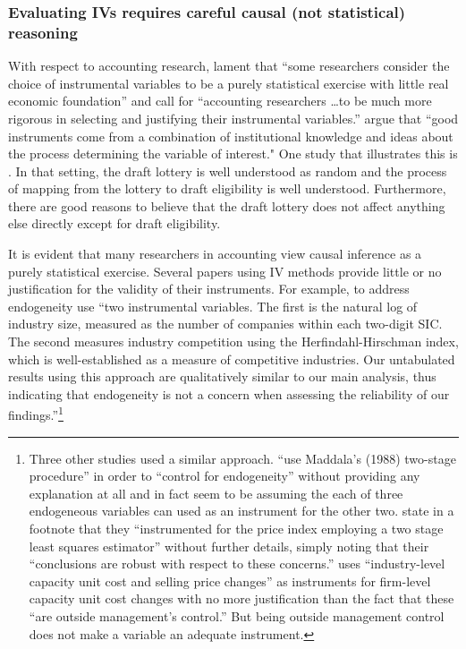 \documentclass[11pt,reqno,titlepage]{amsart}
\begin{document}
\begin{doublespace}
\subsubsection{Evaluating IVs requires careful causal (not statistical) reasoning}

With respect to accounting research, \citet{Larcker:2010fq} lament that ``some researchers consider the choice of instrumental variables to be a purely statistical exercise with little real economic foundation'' and call for 
``accounting researchers \dots to be much more rigorous in selecting and justifying their instrumental variables.'' 
\citet[p.117]{Angrist:2008vk} argue that ``good instruments come from a combination of institutional knowledge and ideas about the process determining the variable of interest."
One study that illustrates this is \citet{Angrist:1990dk}.
In that setting, the draft lottery is well understood as random and the process of mapping from the lottery to draft eligibility is well understood.
Furthermore, there are good reasons to believe that the draft lottery does not affect anything else directly except for draft eligibility.


It is evident that many researchers in accounting view causal inference as a purely statistical exercise.
Several papers using IV methods  provide little or no justification for the validity of their instruments.
For example, to address endogeneity \citet{Cohen:2014jl} use ``two instrumental variables. The first is the natural log of industry size, measured as the number of companies within each two-digit SIC. The second measures industry competition using the Herfindahl-Hirschman index, which is well-established as a measure of competitive industries. Our untabulated results using this approach are qualitatively similar to our main analysis, thus indicating that endogeneity is not a concern when assessing the reliability of our findings.''\footnote{
Three other studies used a similar approach.
 \citet{Vermeer:2014bs} ``use Maddala's (1988) two-stage procedure'' in order to ``control for endogeneity'' without providing any explanation at all and in fact seem to be assuming the each of three endogeneous variables can used as an instrument for the other two.
\citet[p.48]{Fox:2014io} state in a footnote that they ``instrumented for the price index employing a two stage least squares estimator'' without further details, simply noting that their ``conclusions are robust with respect to these concerns.''
\citet{Cannon:2014im} uses ``industry-level capacity unit cost and selling price changes'' as instruments for firm-level capacity unit cost changes with no more justification than the fact that these ``are outside management's control.'' But being outside management control does not make a variable an adequate instrument.}


\end{doublespace}
\end{document}
